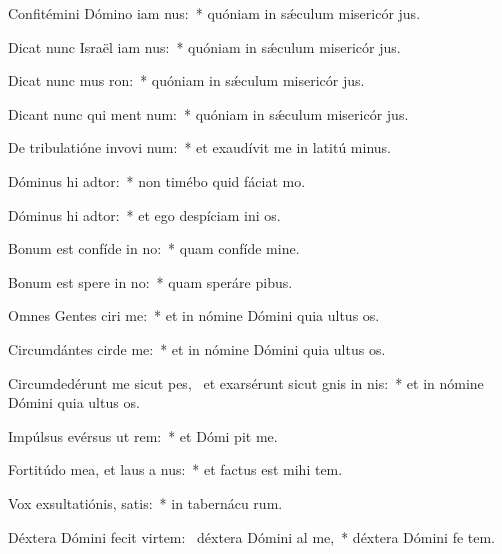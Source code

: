 \item Confitémini Dómino iam nus:~* quóniam in sǽculum misericór jus.
\item Dicat nunc Israël iam nus:~* quóniam in sǽculum misericór jus.
\item Dicat nunc mus ron:~* quóniam in sǽculum misericór jus.
\item Dicant nunc qui ment num:~* quóniam in sǽculum misericór jus.
\item De tribulatióne invovi num:~* et exaudívit me in latitú minus.
\item Dóminus hi adtor:~* non timébo quid fáciat  mo.
\item Dóminus hi adtor:~* et ego despíciam ini os.
\item Bonum est confíde in no:~* quam confíde  mine.
\item Bonum est spere in no:~* quam speráre  pibus.
\item Omnes Gentes ciri me:~* et in nómine Dómini quia ultus   os.
\item Circumdántes cirde me:~* et in nómine Dómini quia ultus   os.
\item Circumdedérunt me sicut pes,~\pscross{} et exarsérunt sicut gnis in nis:~* et in nómine Dómini quia ultus   os.
\item Impúlsus evérsus  ut rem:~* et Dómi pit me.
\item Fortitúdo mea, et laus a nus:~* et factus est mihi  tem.
\item Vox exsultatiónis,  satis:~* in tabernácu rum.
\item Déxtera Dómini fecit virtem:~\pscross{} déxtera Dómini al me,~* déxtera Dómini fe tem.
